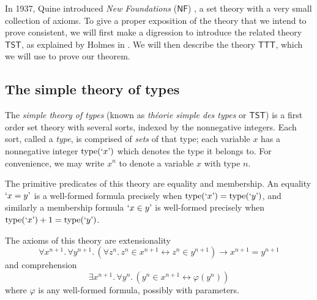 In 1937, Quine introduced \emph{New Foundations} (\( \mathsf{NF} \)) \cite{quine-nf}, a set theory with a very small collection of axioms.
To give a proper exposition of the theory that we intend to prove consistent, we will first make a digression to introduce the related theory \( \mathsf{TST} \), as explained by Holmes in \cite{holmes2023nf}.
We will then describe the theory \( \mathsf{TTT} \), which we will use to prove our theorem.

\subsection{The simple theory of types}

The \emph{simple theory of types} (known as \emph{théorie simple des types} or \( \mathsf{TST} \)) is a first order set theory with several sorts, indexed by the nonnegative integers.
Each sort, called a \emph{type}, is comprised of \emph{sets} of that type; each variable \( x \) has a nonnegative integer \( \operatorname{type}(\text{`}x\text{'}) \) which denotes the type it belongs to.
For convenience, we may write \( x^n \) to denote a variable \( x \) with type \( n \).

The primitive predicates of this theory are equality and membership.
An equality \( \text{`}x = y\text{'} \) is a well-formed formula precisely when \( \operatorname{type}(\text{`}x\text{'}) = \operatorname{type}(\text{`}y\text{'}) \), and similarly a membership formula \( \text{`}x \in y\text{'} \) is well-formed precisely when \( \operatorname{type}(\text{`}x\text{'}) + 1 = \operatorname{type}(\text{`}y\text{'}) \).

The axioms of this theory are extensionality
\[ \forall x^{n + 1}.\, \forall y^{n + 1}.\, (\forall z^n.\, z^n \in x^{n+1} \leftrightarrow z^n \in y^{n+1}) \to x^{n+1} = y^{n+1} \]
and comprehension
\[ \exists x^{n + 1}.\, \forall y^n.\, (y^n \in x^{n+1} \leftrightarrow \varphi(y^n)) \]
where \( \varphi \) is any well-formed formula, possibly with parameters.

